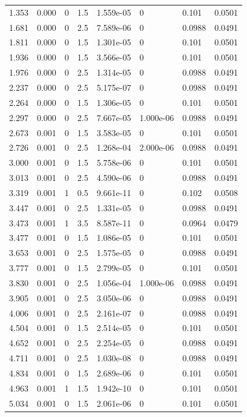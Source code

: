 \documentclass[preview]{standalone}
\begin{document}
{{\begin{tabular}{L{1.2cm}C{1.2cm} C{0.3cm}C{0.5cm} C{1.4cm}C{1.4cm} C{1.4cm}C{1.4cm}}
  1.353  &  0.000  & 0     & 1.5 &  1.559e-05  & 0  & 0.101 &  0.0501   \\ 
  1.681  &  0.000  & 0     & 2.5 &  7.589e-06  & 0  & 0.0988 &  0.0491   \\ 
  1.811  &  0.000  & 0     & 1.5 &  1.301e-05  & 0  & 0.101 &  0.0501   \\ 
  1.936  &  0.000  & 0     & 1.5 &  3.566e-05  & 0  & 0.101 &  0.0501   \\ 
  1.976  &  0.000  & 0     & 2.5 &  1.314e-05  & 0  & 0.0988 &  0.0491   \\ 
  2.237  &  0.000  & 0     & 2.5 &  5.175e-07  & 0  & 0.0988 &  0.0491   \\ 
  2.264  &  0.000  & 0     & 1.5 &  1.306e-05  & 0  & 0.101 &  0.0501   \\ 
  2.297  &  0.000  & 0     & 2.5 &  7.667e-05  & 1.000e-06  & 0.0988 &  0.0491   \\ 
  2.673  &  0.001  & 0     & 1.5 &  3.583e-05  & 0  & 0.101 &  0.0501   \\ 
  2.726  &  0.001  & 0     & 2.5 &  1.268e-04  & 2.000e-06  & 0.0988 &  0.0491   \\ 
  3.000  &  0.001  & 0     & 1.5 &  5.758e-06  & 0  & 0.101 &  0.0501   \\ 
  3.013  &  0.001  & 0     & 2.5 &  4.590e-06  & 0  & 0.0988 &  0.0491   \\ 
  3.319  &  0.001  & 1     & 0.5 &  9.661e-11  & 0  & 0.102 &  0.0508   \\ 
  3.447  &  0.001  & 0     & 2.5 &  1.331e-05  & 0  & 0.0988 &  0.0491   \\ 
  3.473  &  0.001  & 1     & 3.5 &  8.587e-11  & 0  & 0.0964 &  0.0479   \\ 
  3.477  &  0.001  & 0     & 1.5 &  1.086e-05  & 0  & 0.101 &  0.0501   \\ 
  3.653  &  0.001  & 0     & 2.5 &  1.575e-05  & 0  & 0.0988 &  0.0491   \\ 
  3.777  &  0.001  & 0     & 1.5 &  2.799e-05  & 0  & 0.101 &  0.0501   \\ 
  3.830  &  0.001  & 0     & 2.5 &  1.056e-04  & 1.000e-06  & 0.0988 &  0.0491   \\ 
  3.905  &  0.001  & 0     & 2.5 &  3.050e-06  & 0  & 0.0988 &  0.0491   \\ 
  4.006  &  0.001  & 0     & 2.5 &  2.161e-07  & 0  & 0.0988 &  0.0491   \\ 
  4.504  &  0.001  & 0     & 1.5 &  2.514e-05  & 0  & 0.101 &  0.0501   \\ 
  4.652  &  0.001  & 0     & 2.5 &  2.254e-05  & 0  & 0.0988 &  0.0491   \\ 
  4.711  &  0.001  & 0     & 2.5 &  1.030e-08  & 0  & 0.0988 &  0.0491   \\ 
  4.834  &  0.001  & 0     & 1.5 &  2.689e-06  & 0  & 0.101 &  0.0501   \\ 
  4.963  &  0.001  & 1     & 1.5 &  1.942e-10  & 0  & 0.101 &  0.0501   \\ 
  5.034  &  0.001  & 0     & 1.5 &  2.061e-06  & 0  & 0.101 &  0.0501   \\ 
\hline 
\end{tabular} 

}}
\end{document}
